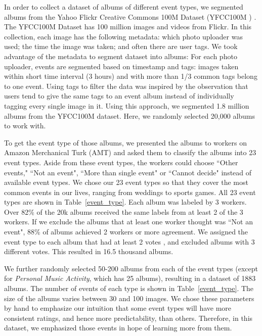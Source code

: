 \documentclass[10pt,twocolumn,letterpaper]{article}
\begin{document}
In order to collect a dataset of albums of different event types, we segmented albums from the Yahoo Flickr Creative Commons 100M Dataset (YFCC100M ) \cite{thomee2015yfcc100m}. The YFCC100M Dataset has 100 million images and videos from Flickr. In this collection, each image has the following metadata: which photo uploader was used; the time the image was taken; and often there are user tags. We took advantage of the metadata to segment dataset into albums: For each photo uploader, events are segmented based on timestamp and tags: images taken within short time interval (3 hours) and with more than 1/3 common tags belong to one event. Using tags to filter the data was inspired by the observation that users tend to give the same tags to an event album instead of individually tagging every single image in it. Using this approach, we segmented 1.8 million albums from the YFCC100M dataset. Here, we randomly selected 20,000 albums to work with. 

To get the event type of those albums, we presented the albums to workers on Amazon Merchanical Turk (AMT) and asked them to classify the albums into 23 event types. Aside from these event types, the workers could choose ``Other events," ``Not an event", ``More than single event" or ``Cannot decide" instead of available event types. We chose our 23 event types so that they cover the most common events in our lives, ranging from weddings to sports games. %
All 23 event types are shown in Table~\ref{event_type}. Each album was labeled by 3 workers. Over 82\% of the 20k albums received the same labels from at least 2 of the 3 workers. 
If we exclude the albums that at least one worker thought was ``Not an event", 88\% of albums achieved 2 workers or more agreement.
We assigned the event type to each album that had at least 2 votes %
, and excluded albums with 3 different votes. This resulted in 16.5 thousand albums.

We further randomly selected 50-200 albums from each of the event types (except for \textit{Personal Music Activity}, which has 25 albums), resulting in a dataset of 1883 albums. The number of events of each type is shown in Table~\ref{event_type}. The size of the albums varies between 30 and 100 images. We chose these parameters by hand to emphasize our intuition that some event types will have more consistent ratings, and hence more predictability, than others.  Therefore, in this dataset, we emphasized those events in hope of learning more from them.
\end{document}
